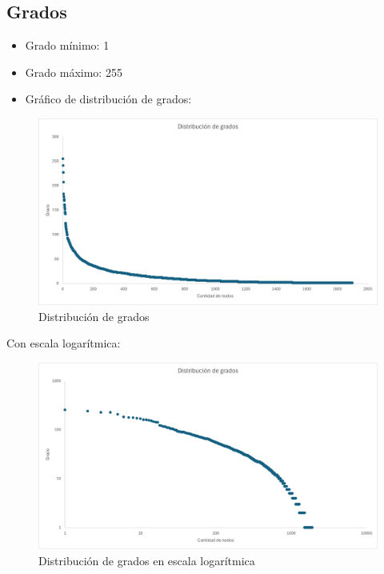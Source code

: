 \documentclass[12pt]{article}
\begin{document}
\subsection{Grados}

\begin{itemize}
    \item Grado mínimo: 1
    \item Grado máximo: 255
    \item Gráfico de distribución de grados: 
\end{itemize}
\begin{figure}[H]
    \begin{center}
        \includegraphics[scale=0.35]{images/distribucion_grados.png}
    \end{center}
    \caption{Distribución de grados}
    \label{fig:distribution}
\end{figure}
Con escala logarítmica:

\begin{figure}[H]
    \begin{center}
        \includegraphics[scale=0.35]{images/distribucion_grados_log_log.png}
    \end{center}
    \caption{Distribución de grados en escala logarítmica}
    \label{fig:distribution-log-log}
\end{figure}
\end{document}
